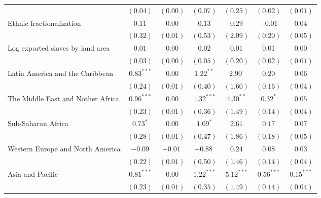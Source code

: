 \begin{sidewaystable}[H]
\begin{center}
{\begin{tabular}{l c c c c c c}
                                  & $(0.04)$     & $(0.00)$        & $(0.07)$        & $(0.25)$       & $(0.02)$     & $(0.01)$       \\
Ethnic fractionalization          & $0.11$       & $0.00$          & $0.13$          & $0.29$         & $-0.01$      & $0.04$         \\
                                  & $(0.32)$     & $(0.01)$        & $(0.53)$        & $(2.09)$       & $(0.20)$     & $(0.05)$       \\
Log exported slaves by land area  & $0.01$       & $0.00$          & $0.02$          & $0.01$         & $0.01$       & $0.00$         \\
                                  & $(0.03)$     & $(0.00)$        & $(0.05)$        & $(0.20)$       & $(0.02)$     & $(0.01)$       \\
Latin America and the Caribbean   & $0.83^{***}$ & $0.00$          & $1.22^{**}$     & $2.90^{\cdot}$ & $0.20$       & $0.06$         \\
                                  & $(0.24)$     & $(0.01)$        & $(0.40)$        & $(1.60)$       & $(0.16)$     & $(0.04)$       \\
The Middle East and Nother Africa & $0.96^{***}$ & $0.00$          & $1.32^{***}$    & $4.30^{**}$    & $0.32^{*}$   & $0.05$         \\
                                  & $(0.23)$     & $(0.01)$        & $(0.36)$        & $(1.49)$       & $(0.14)$     & $(0.04)$       \\
Sub-Saharan Africa                & $0.73^{*}$   & $0.00$          & $1.09^{*}$      & $2.61$         & $0.17$       & $0.07$         \\
                                  & $(0.28)$     & $(0.01)$        & $(0.47)$        & $(1.86)$       & $(0.18)$     & $(0.05)$       \\
Western Europe and North America  & $-0.09$      & $-0.01^{\cdot}$ & $-0.88^{\cdot}$ & $0.24$         & $0.08$       & $0.03$         \\
                                  & $(0.22)$     & $(0.01)$        & $(0.50)$        & $(1.46)$       & $(0.14)$     & $(0.04)$       \\
Asia and Pacific                  & $0.81^{***}$ & $0.00$          & $1.22^{***}$    & $5.12^{***}$   & $0.56^{***}$ & $0.15^{***}$   \\
                                  & $(0.23)$     & $(0.01)$        & $(0.35)$        & $(1.49)$       & $(0.14)$     & $(0.04)$       \\

\end{tabular}}
\end{center}
\end{sidewaystable}
